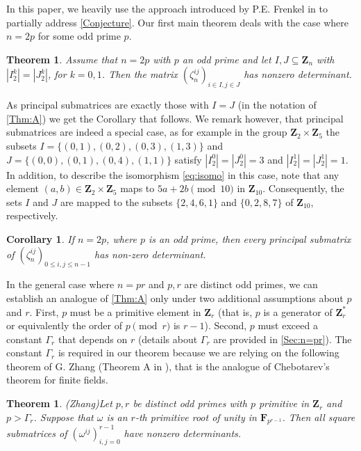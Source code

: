 \documentclass[a4paper,12pt,reqno]{amsart}
\newtheorem{prevtheorem}{Theorem}
\newtheorem{theorem}{Theorem}
\newtheorem{corollary}{Corollary}
\def\Z{\mathbf{Z}}
\def\F{\mathbf{F}}
\begin{document}
In this paper, we heavily use the approach introduced by P.E. Frenkel in \cite{Frenkel}  to partially address \autoref{Conjecture}.  Our first main theorem deals with  the case where \( n=2p \) for some odd prime \( p \).
\begin{prevtheorem}\label{Thm:A}
 Assume that $n=2p$ with $p$ an odd prime and  let   $I, J \subseteq \Z_{n}$ with $|I_2^k| = |J_2^k|$, for  $k=0,1$.  Then the matrix $(\zeta_{n}^{ij})_{i \in I, j\in J}$ has nonzero determinant.    
\end{prevtheorem}

As principal  submatrices  are exactly those with $I = J$ (in the notation of \autoref{Thm:A}) we get the Corollary that follows. We remark however,  that 
principal submatrices are indeed a special case, as for example in the group $\Z_2 \times \Z_5$ 
the subsets 
$I = \{ (0,1), (0,2), (0,3), (1,3)\}$ and $J=\{ (0,0), (0,1), (0,4), (1,1)\}$ satisfy $|I_2^0| = |J_2^0|=3$ and $|I_2^1| = |J_2^1|=1$. In addition, to describe the isomorphism \eqref{eq:isomo} in this case, note that any element $(a,b) \in \Z_2 \times \Z_5$ maps to $5a +2b \pmod{10}$ in $\Z_{10}$. Consequently, the sets $I$ and $J$ are mapped to the subsets $\{2,4,6,1\}$ and $\{0,2,8,7\}$ of $\Z_{10}$, respectively.
\begin{corollary}\label{Cor:n=2p}
If  $n=2p$,  where $p$ is an odd prime, then every  principal submatrix of $(\zeta_n^{ij})_{0 \leq i,j\leq n-1}$ has non-zero determinant.
\end{corollary}



In the general case where \( n = pr \) and \( p, r \) are distinct odd primes, we can establish an analogue of \autoref{Thm:A} only under two additional assumptions about \( p \) and \( r \). First, \( p \) must be a primitive element in \( \Z_r \) (that is, $p$ is a generator of $\Z_r^*$ or equivalently the order of $p \pmod r$ is $r-1$).  Second, \( p \) must exceed a constant \( \Gamma_r \) that depends on \( r \) (details about \( \Gamma_r \) are provided in \autoref{Sec:n=pr}). 
The constant $\Gamma_r$ is required in our theorem  because we are relying on  the following theorem of G. Zhang (Theorem A in \cite{Zhang}),   that is the analogue of Chebotarev's theorem for finite fields.   
\begin{theorem}(Zhang)\label{Zhang}
    Let $p, r$ be distinct odd primes with $p$ primitive  in  $\Z_r$ and $p > \Gamma_r$.  Suppose that  $\omega$ is an $r$-th  primitive root of unity in $\F_{p^{r-1}}$. Then all square submatrices of $(\omega^{ij})_{i,j= 0}^{r-1}$  have nonzero determinants. 
\end{theorem}
\end{document}
